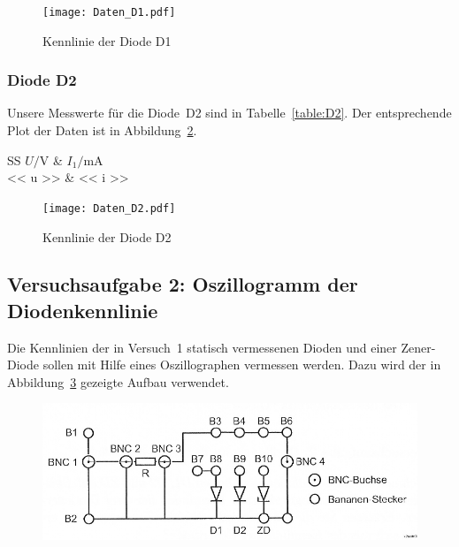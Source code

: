 \begin{figure}[htbp]
	\centering
	\texttt{[image: Daten\_D1.pdf]}
	\caption{%
		Kennlinie der Diode D1
	}
	\label{fig:D1}
\end{figure}

\FloatBarrier
\subsubsection{Diode D2}

Unsere Messwerte für die Diode~D2 sind in Tabelle~\ref{table:D2}. Der
entsprechende Plot der Daten ist in Abbildung~\ref{fig:D2}.

\begin{table}[htbp]
	\centering
	\begin{tabular}{SS}
		{$U / \si\volt$} & {$I_1 / \si{\milli\ampere}$} \\
		\hline
		<< u >> & << i >> \\
	\end{tabular}
	\caption{%
		Messdaten zur Diode D2
	}
	\label{table:D2}
\end{table}

\begin{figure}[htbp]
	\centering
	\texttt{[image: Daten\_D2.pdf]}
	\caption{%
		Kennlinie der Diode D2
	}
	\label{fig:D2}
\end{figure}

\FloatBarrier
\subsection{Versuchsaufgabe 2: Oszillogramm der Diodenkennlinie}

Die Kennlinien der in Versuch~1 statisch vermessenen Dioden und einer
Zener-Diode sollen mit Hilfe eines Oszillographen vermessen werden. Dazu wird
der in Abbildung~\ref{fig:2-6} gezeigte Aufbau verwendet.

\begin{figure}[htbp]
	\centering
	\includegraphics[width=.8\textwidth]{Bilder_aus_Anleitung/2-6.png}
	\caption{%
		\cite[Abbildung~2.6]{physik313-Anleitung}
	}
	\label{fig:2-6}
\end{figure}

